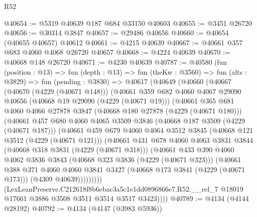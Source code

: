 \begin{lexlean}{R52}
\begin{coremodule}
@40654 := @5319 @40639 @187 @684 @33150 @40603
@40655 := @3451 @26720
@40656 := @30314 @3847
@40657 := @29486 @40656
@40660 := @40654 (@40655 @40657) @40612
@40661 := @4215 @40639
@40667 := @40661 @357 @683 @4060 @4068 @26720 @40657
@40668 := @4224 @40639
@40670 := @40668 @148 @26720
@40671 := @4230 @40639
@40787 := @40580
    (fun (position : @13) =>
    fun (depth : @13) =>
    fun (theKw : @3560) =>
    fun (alts : @3829) =>
    fun (pending : @3830) =>
    @40617
      (@40649
        (@40660
          (@40667
            (@40670 (@4229 (@40671 @148)))
            (@40661
              @359
              @682
              @4060
              @4067
              @29090
              @40656
              (@40668 @19 @29090 (@4229 (@40671 @19)))
              (@40661
                @365
                @681
                @4060
                @4066
                @27878
                @3847
                (@40668 @180 @27878 (@4229 (@40671 @180)))
                (@40661
                  @457
                  @680
                  @4060
                  @4065
                  @3509
                  @3846
                  (@40668 @187 @3509 (@4229 (@40671 @187)))
                  (@40661
                    @459
                    @679
                    @4060
                    @4064
                    @3512
                    @3845
                    (@40668 @121 @3512 (@4229 (@40671 @121)))
                    (@40661
                      @431
                      @678
                      @4060
                      @4063
                      @3831
                      @3844
                      (@40668 @318 @3831 (@4229 (@40671 @318)))
                      (@40661
                        @433
                        @390
                        @4060
                        @4062
                        @3836
                        @3843
                        (@40668 @323 @3836 (@4229 (@40671 @323)))
                        (@40661
                          @388
                          @371
                          @4060
                          @4060
                          @3841
                          @3427
                          (@40668 @173 @3841 (@4229 (@40671 @173)))
                          (@4309 @40639)))))))))
          (LexLeanPreserve.C212618f8b6ebac3a5c1e1dd0896866e7.R52.__rel_7
            @18019
            @17661
            @3886
            @3508
            @3511
            @3514
            @3517
            @3423))))
@40789 := @4134 (@4144 @28192)
@40792 := @4134 (@4147 (@3983 @5936))

\end{coremodule}
\end{lexlean}
